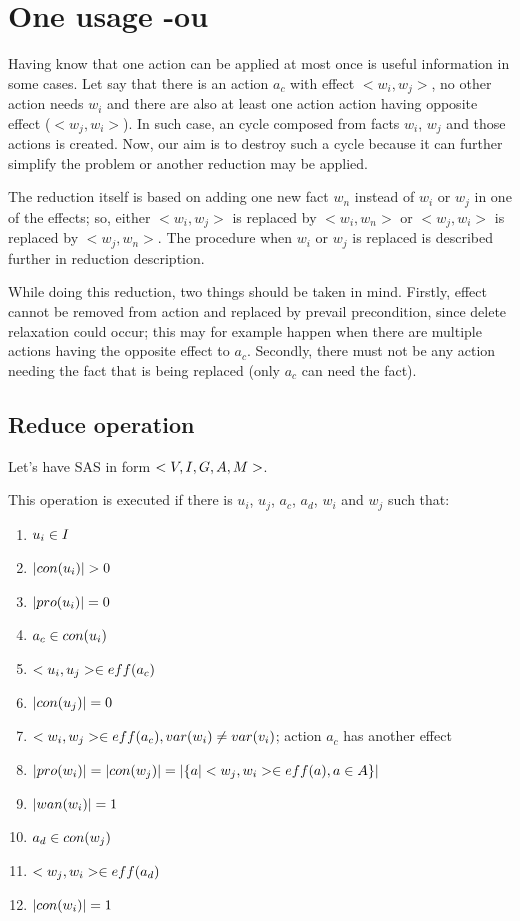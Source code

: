 \chapter{One usage -ou}
	
	Having know that one action can be applied at most once is useful information in some cases. Let say that there is an action $a_c$ with effect $<w_i,w_j>$, no other action needs $w_i$ and there are also at least one action action having opposite effect ($<w_j,w_i>$). In such case, an cycle composed from facts $w_i$, $w_j$ and those actions is created. Now, our aim is to destroy such a cycle because it can further simplify the problem or another reduction may be applied. 
	
	The reduction itself is based on adding one new fact $w_n$ instead of $w_i$ or $w_j$ in one of the effects; so, either $<w_i,w_j>$ is replaced by $<w_i,w_n>$ or $<w_j,w_i>$ is replaced by $<w_j,w_n>$. The procedure when $w_i$ or $w_j$ is replaced is described further in reduction description.
	
	While doing this reduction, two things should be taken in mind. Firstly, effect cannot be removed from action and replaced by prevail precondition, since delete relaxation could occur; this may for example happen when there are multiple actions having the opposite effect to $a_c$. Secondly, there must not be any action needing the fact that is being replaced (only $a_c$ can need the fact).
	
	
	\section{Reduce operation}
	Let's have SAS in form $<V, I, G, A, M{}>$. 
	
	This operation is executed if there is $u_i$, $u_j$, $a_c$, $a_d$, $w_i$ and $w_j$ such that:
	
	\begin{enumerate}
		\item $u_i \in I$ \label{ou:in:ai:invariantStart}
		\item $|con(u_i)| > 0$ 
		\item $|pro(u_i)| = 0$ 
		\item $a_c \in con(u_i)$ 
		\item $<u_i,u_j> \in eff(a_c)$ 
		\item $|con(u_j)| = 0$ \label{ou:in:ai:invariantEnd}
		\item $<w_i,w_j> \in eff(a_c), var(w_i) \neq var(v_i)$; action $a_c$ has another effect
		\item $|pro(w_i)| = |con(w_j)| = |\{a | <w_j,w_i> \in eff(a), a \in A \}|$ \label{ou:in:onlyActionWithOppositeEffect}
		\item $|wan(w_i)| = 1$ \label{ou:in:noPre}
		\item $a_d \in con(w_j)$
		\item $<w_j,w_i> \in eff(a_d)$
		\item $|con(w_i)| = 1$
	\end{enumerate}
	
